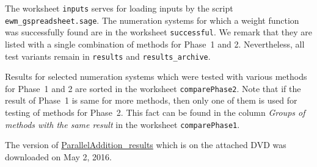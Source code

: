 The worksheet \verb+inputs+ serves for loading inputs by the script \verb+ewm_gspreadsheet.sage+. The numeration systems for which a weight function was successfully found are in the worksheet \verb+successful+. We remark that they are listed with a single combination of methods for Phase~1 and 2. Nevertheless, all test variants remain in \verb+results+ and \verb+results_archive+. 

Results for selected numeration systems which were tested with various  methods for Phase~1 and 2 are sorted in the worksheet \verb+comparePhase2+. Note that if the result of Phase~1 is same for more methods, then only one of them is used for testing of methods for Phase~2. This fact can be found in the column \emph{Groups of methods with the same result} in the worksheet \verb+comparePhase1+.

The version of \href{https://docs.google.com/spreadsheets/d/1TnhrHdefHfHa0WSeVs4q6XVj3epjPlPlnoekE0E1xeM/edit?usp=sharing}{ParallelAddition\_results} which is on the attached DVD was downloaded on May 2, 2016.
